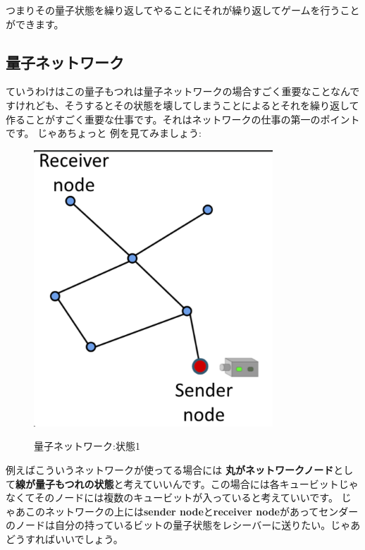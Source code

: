 つまりその量子状態を繰り返してやることにそれが繰り返してゲームを行うことができます。
\subsection{量子ネットワーク}
ていうわけはこの量子もつれは量子ネットワークの場合すごく重要なことなんですけれども、そうするとその状態を壊してしまうことによるとそれを繰り返して作ることがすごく重要な仕事です。それはネットワークの仕事の第一のポイントです。
じゃあちょっと
例を見てみましょう:
\begin{figure}[H]
   \centering
    \includegraphics[width=0.8\textwidth]{lesson4/network_diagram.pdf}
    \label{fig: 1}
    \begin{center}
        \caption{量子ネットワーク:状態1}
    \end{center}
\end{figure}
例えばこういうネットワークが使ってる場合には
\textbf{丸がネットワークノード}として\textbf{線が量子もつれの状態}と考えていいんです。この場合には各キュービットじゃなくてそのノードには複数のキュービットが入っていると考えていいです。
じゃあこのネットワークの上には\textbf{sender node}と\textbf{receiver node}があってセンダーのノードは自分の持っているビットの量子状態をレシーバーに送りたい。じゃあどうすればいいでしょう。

